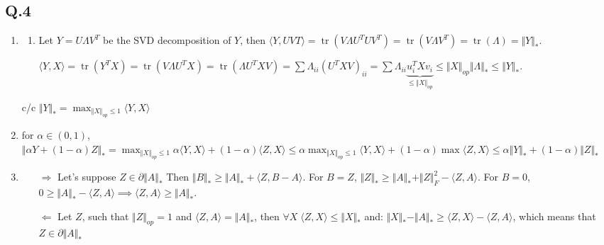 \documentclass[12pt]{article}
\newcommand{\Q}[1]{\subsection*{Q.#1}}
\newenvironment{question}[1]
{\Q{#1}}{}
\newcommand{\norm}[1]{\Vert #1 \Vert}
\DeclareMathOperator{\tr}{tr}
\begin{document}
\begin{question}{4}
  \begin{enumerate}
  \item 
    \begin{enumerate}
    \item
      Let $Y = U\Lambda V^T$ be the SVD decomposition of $Y$,
      then $\langle Y, UVT\rangle  = \tr(V\Lambda U^TUV^T) = \tr(V\Lambda V^T) = \tr(\Lambda) = \Vert Y\Vert _*$.


      $\langle Y, X\rangle  = \tr(Y^TX) = \tr(V \Lambda U^TX) = \tr(\Lambda U^TXV) = \sum \Lambda_{ii} (U^TXV)_{ii}  = \sum \Lambda_{ii} \underbrace{u_i^TXv_i}_{\le \Vert X\Vert _{op}} \le  \Vert X\Vert _{op} \Vert \Lambda\Vert _* \le \Vert Y\Vert _*$.


    \end{enumerate}
    c/c $\Vert Y\Vert _* = \max_{\Vert X\Vert _{op} \le 1} \langle Y, X\rangle $

  \item for $\alpha \in (0, 1)$,
    $\Vert \alpha Y + (1-\alpha)Z\Vert _* = \max_{\Vert X\Vert _{op} \le 1} \alpha \langle Y, X\rangle  + (1-\alpha) \langle Z, X\rangle  \le \alpha \max_{\Vert X\Vert _{op} \le 1} \langle Y, X\rangle  + (1-\alpha) \max \langle Z, X\rangle  \le \alpha \Vert Y\Vert _* + (1-\alpha) \Vert Z\Vert _*$
  \item
    \begin{enumerate}
    \item[$\Rightarrow$] Let's suppose $Z \in \partial \Vert A \Vert _*$
      Then $\norm{B}_* \ge \norm{A}_* + \langle Z, B - A\rangle $.
      For $B = Z$, $\norm{Z}_* \ge \norm{A}_* + \norm{Z}_F^2 - \langle Z, A\rangle $.
      For $B = 0$,  $0 \ge \norm{A}_* - \langle Z, A\rangle \implies \langle Z, A\rangle \ge \norm{A}_*$.
    \item[$\Leftarrow$]Let $Z$, such that $\norm{Z}_{op} = 1$ and $\langle Z, A\rangle  = \norm{A}_*$, then $\forall X \;  \langle Z, X\rangle  \le \norm{X}_*$ and:
      $\norm{X}_* - \norm{A}_* \ge \langle Z, X\rangle  - \langle Z, A\rangle $, which means that $Z \in \partial \norm{A}_*$
      

\end{enumerate}
\end{enumerate}
\end{question}
\end{document}
